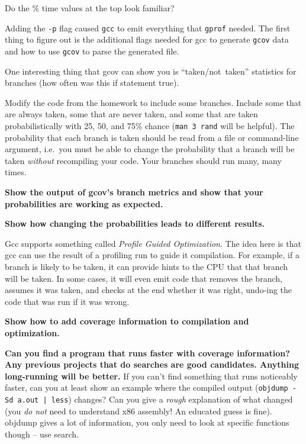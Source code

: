 \documentclass{article}
\begin{document}
Do the \% time values at the top look familiar?

Adding the \texttt{-p} flag caused \texttt{gcc} to emit everything that
\texttt{gprof} needed. The first thing to figure out is the additional flags
needed for gcc to generate \texttt{gcov} data and how to use \texttt{gcov} to
parse the generated file.

\vspace{1cm}

One interesting thing that gcov can show you is ``taken/not~taken'' statistics
for branches (how often was this if statement true).

Modify the code from the homework to include some branches. Include some that
are always taken, some that are never taken, and some that are taken
probabilistically with 25, 50, and 75\% chance (\texttt{man~3~rand} will be
helpful). The probability that each branch is taken should be read from a
file or command-line argument, i.e.\ you must be able to change the
probability that a branch will be taken \emph{without} recompiling your code.
Your branches should run many, many times.

\textbf{Show the output of gcov's branch metrics and show that your
  probabilities are working as expected.}

\textbf{Show how changing the probabilities leads to different results.}
\vspace{1cm}

Gcc supports something called \emph{Profile Guided Optimization}. The idea
here is that gcc can use the result of a profiling run to guide it
compilation. For example, if a branch is likely to be taken, it can provide
hints to the CPU that that branch will be taken. In some cases, it will even
emit code that removes the branch, assumes it was taken, and checks at the end
whether it was right, undo-ing the code that was run if it was wrong.

\textbf{Show how to add coverage information to compilation and optimization.}

\textbf{Can you find a program that runs faster with coverage information? Any
  previous projects that do searches are good candidates. Anything
  long-running will be better.}
If you can't find something that runs noticeably faster, can you at least show
an example where the compiled output (\texttt{objdump -Sd a.out | less}) changes? Can you give
a \emph{rough} explanation of what changed (you \emph{do not} need to
understand x86 assembly! An educated guess is fine). objdump gives a lot of
information, you only need to look at specific functions though -- use search.
\end{document}
